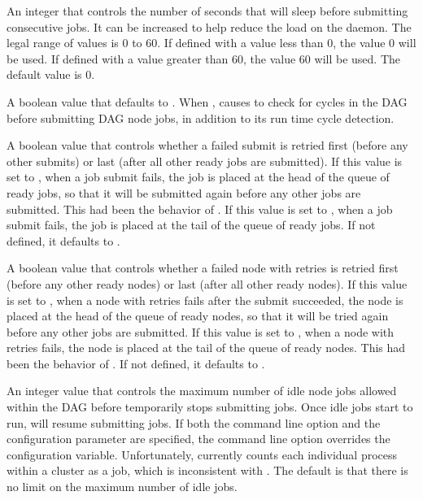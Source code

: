 \begin{description}
\label{param:DAGManSubmitDelay}
\item[\Macro{DAGMAN\_SUBMIT\_DELAY}]
  An integer that controls the number of seconds
  that  will sleep before submitting consecutive jobs.
  It can be increased to help reduce the load on the  daemon.
  The legal range of values is 0 to 60.
  If defined with a value less than 0, the  value 0 will be used.
  If defined with a value greater than 60, the value 60 will be used.
  The default value is 0.

\label{param:DAGManStartupCycleDetect}
\item[\Macro{DAGMAN\_STARTUP\_CYCLE\_DETECT}]
  A boolean value that defaults to .
  When ,
  causes  to check for cycles in the DAG before
  submitting DAG node jobs,
  in addition to its run time cycle detection.

\label{param:DAGManRetrySubmitFirst}
\item[\Macro{DAGMAN\_RETRY\_SUBMIT\_FIRST}]
  A boolean value that controls whether a failed submit is retried first
  (before any other submits) or last (after all other ready jobs are
  submitted).  If this value is set to , when a job submit
  fails, the job is placed at the head of the queue of ready jobs, so
  that it will be submitted again before any other jobs are submitted.
  This had been the behavior of .
  If this value is set to , when a job submit fails, the job
  is placed at the tail of the queue of ready jobs.
  If not defined, it defaults to .

\label{param:DAGManRetryNodeFirst}
\item[\Macro{DAGMAN\_RETRY\_NODE\_FIRST}]
  A boolean value that controls whether a failed node with retries
  is retried first (before any other ready nodes) or last (after all
  other ready nodes).  If this value is set to , when a
  node with retries fails after the submit succeeded, the node is
  placed at the head of the queue of ready nodes, so that it will be
  tried again before any other jobs are submitted.  If this value is
  set to , when a node with retries fails, the node
  is placed at the tail of the queue of ready nodes.
  This had been the behavior of .
  If not defined, it defaults to .

\label{param:DAGManMaxJobsIdle}
\item[\Macro{DAGMAN\_MAX\_JOBS\_IDLE}]
  An integer value that controls the maximum number of idle node jobs
  allowed within the DAG before  temporarily stops
  submitting jobs.  Once idle jobs start to run,  will
  resume submitting jobs.  If both the command line option and the
  configuration parameter are specified, the command line option overrides
  the configuration variable.  Unfortunately,
   currently counts each individual
  process within a cluster as a job, which is inconsistent with
  .  The default is that there is
  no limit on the maximum number of idle jobs.


\end{description}
